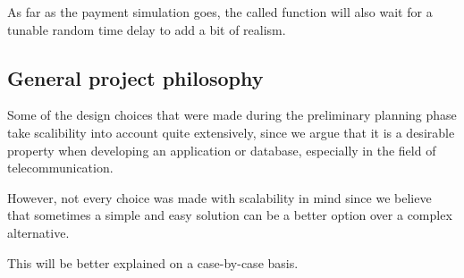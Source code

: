 As far as the payment simulation goes, the called function will also wait for a tunable random time delay to add a bit of realism.

\subsection*{General project philosophy}

Some of the design choices that were made during the preliminary planning phase take scalibility into account quite extensively, since we argue that it is a desirable property when developing an application or database, especially in the field of telecommunication.

However, not every choice was made with scalability in mind since we believe that sometimes a simple and easy solution can be a better option over a complex alternative.

This will be better explained on a case-by-case basis.
